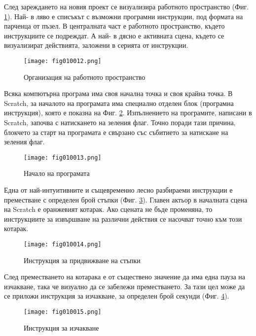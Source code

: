 След зареждането на новия проект се визуализира работното пространство (Фиг. \ref{fig010012}). Най- в ляво е списъкът с възможни програмни инструкции, под формата на парченца от пъзел. В централната част е работното пространство, където инструкциите се подреждат. А най- в дясно е активната сцена, където се визуализират действията, заложени в серията от инструкции. 

\begin{figure}[H]
  \centering
  \texttt{[image: fig010012.png]}
  \caption{Организация на работното пространство}
\label{fig010012}
\end{figure}

Всяка компютърна програма има своя начална точка и своя крайна точка. В Scratch, за началото на програмата има специално отделен блок (програмна инструкция), която е показна на Фиг. \ref{fig010013}. Изпълнението на програмите, написани в Scratch, започва с натискането на зеления флаг. Точно поради тази причина, блокчето за старт на програмата е свързано със събитието за натискане на зеления флаг. 

\begin{figure}[H]
  \centering
  \texttt{[image: fig010013.png]}
  \caption{Начало на програмата}
\label{fig010013}
\end{figure}

Една от най-интуитивните и същевременно лесно разбираеми инструкции е преместване с определен брой стъпки (Фиг. \ref{fig010014}). Главен актьор в началната сцена на Scratch е оранжевият котарак. Ако сцената не бъде променяна, то инструкциите за извършване на различни действия се насочват точно към този котарак. 

\begin{figure}[H]
  \centering
  \texttt{[image: fig010014.png]}
  \caption{Инструкция за придвижване на стъпки}
\label{fig010014}
\end{figure}

След преместването на котарака е от съществено значение да има една пауза на изчакване, така че визуално да се забележи преместването. За тази цел може да се приложи инструкция за изчакване, за определен брой секунди (Фиг. \ref{fig010015}).

\begin{figure}[H]
  \centering
  \texttt{[image: fig010015.png]}
  \caption{Инструкция за изчакване}
\label{fig010015}
\end{figure}

